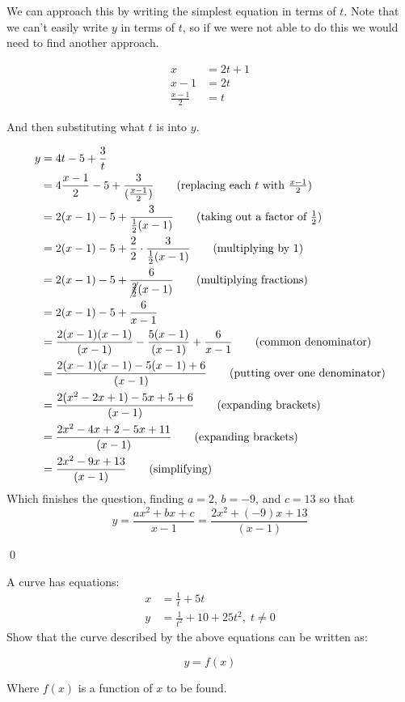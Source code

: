 \begin{solution}
    We can approach this by writing the simplest equation in terms of $t$. Note that we can't easily write $y$ in terms of $t$, so if we were not able to do this we would need to find another approach.

    \begin{align*}
        x &= 2t+1 \\
        x - 1 &= 2t \\
        \frac{x-1}{2} &= t
    \end{align*}

    And then substituting what $t$ is into $y$.

    \begin{align*}
        y &= 4t - 5 + \frac{3}{t} \\
         &= 4\frac{x-1}{2} - 5 +\frac{3}{(\frac{x-1}{2})} \tag{replacing each $t$ with $\frac{x-1}{2}$}\\
         &= 2(x-1) - 5 +\frac{3}{\frac{1}{2}(x-1)} \tag{taking out a factor of $\frac{1}{2}$} \\
         &= 2(x-1) - 5 + \frac{2}{2} \cdot \frac{3}{\frac{1}{2}(x-1)} \tag{multiplying by $1$} \\
         &= 2(x-1) - 5 + \frac{6}{\cancel{\frac{2}{2}}(x-1)} \tag{multiplying fractions}\\
         &= 2(x-1) - 5 + \frac{6}{x-1}\\
         &= \frac{2(x-1)(x-1)}{(x-1)} - \frac{5(x-1)}{(x-1)} + \frac{6}{x-1} \tag{common denominator}\\ 
         &= \frac{2(x-1)(x-1) - 5(x-1) + 6}{(x-1)} \tag{putting over one denominator}\\
         &= \frac{2(x^2-2x+1) - 5x+5 + 6}{(x-1)} \tag{expanding brackets}\\
         &= \frac{2x^2-4x+2 - 5x+11}{(x-1)} \tag{expanding brackets}\\
         &= \frac{2x^2-9x+13}{(x-1)} \tag{simplifying}
    \end{align*}
    Which finishes the question, finding $a=2$, $b=-9$, and $c=13$ so that 
    \[y = \frac{ax^2 + bx + c}{x-1} = \frac{2x^2+(-9)x+13}{(x-1)} \]

    \qed
\end{solution}

\begin{example}
    A curve has equations:
    \begin{align*}
        x &= \frac{1}{t} +5t\\
        y &= \frac{1}{t^2} + 10 + 25t^2, \; t\neq 0
    \end{align*}
    Show that the curve described by the above equations can be written as:

    \[ y = f(x)\]

    Where $f(x)$ is a function of $x$ to be found.
\end{example}

